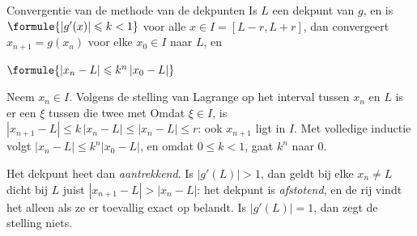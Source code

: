 \begin{theorie}
\begin{stelling}{Convergentie van de methode van de dekpunten}
Is $L$ een dekpunt van $g$, en is $\formule{|g'(x)| \leqslant k < 1}$ voor alle $x \in I = [L - r, L + r]$, dan convergeert $x_{n+1} = g(x_n)$ voor elke $x_0 \in I$ naar $L$, en

\vspace{1mm}
\qquad $\formule{|x_n - L| \leqslant k^n\,|x_0 - L|}$
\end{stelling}

\begin{bewijs}
Neem $x_n \in I$. Volgens de stelling van Lagrange op het interval tussen $x_n$ en $L$ is er een $\xi$ tussen die twee met
Omdat $\xi \in I$, is $|x_{n+1} - L| \leqslant k\,|x_n - L| \leqslant |x_n - L| \leqslant r$: ook $x_{n+1}$ ligt in $I$. Met volledige inductie volgt $|x_n - L| \leqslant k^n |x_0 - L|$, en omdat $0 \leqslant k < 1$, gaat $k^n$ naar 0.
\end{bewijs}
\end{theorie}

Het dekpunt heet dan \emph{aantrekkend}. Is $|g'(L)| > 1$, dan geldt bij elke $x_n \neq L$ dicht bij $L$ juist $|x_{n+1} - L| > |x_n - L|$: het dekpunt is \emph{afstotend}, en de rij vindt het alleen als ze er toevallig exact op belandt. Is $|g'(L)| = 1$, dan zegt de stelling niets.


